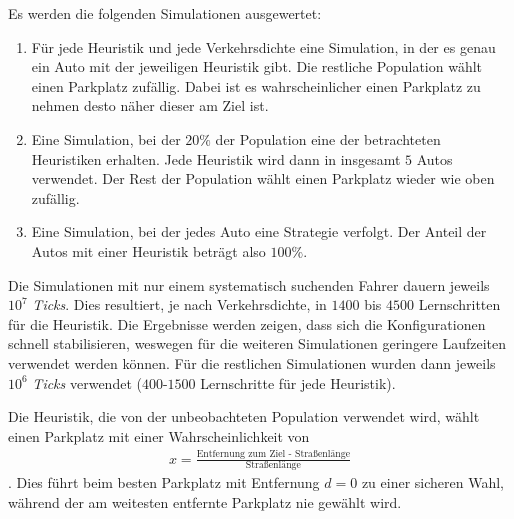 Es werden die folgenden Simulationen ausgewertet:
\begin{enumerate}
	\item Für jede Heuristik und jede Verkehrsdichte eine Simulation, in der es genau ein Auto mit der jeweiligen Heuristik gibt. Die restliche Population wählt einen Parkplatz zufällig. Dabei ist es wahrscheinlicher einen Parkplatz zu nehmen desto näher dieser am Ziel ist.
	\item Eine Simulation, bei der $20\%$ der Population eine der betrachteten Heuristiken erhalten. Jede Heuristik wird dann in insgesamt $5$ Autos verwendet. Der Rest der Population wählt einen Parkplatz wieder wie oben zufällig. 
	\item Eine Simulation, bei der jedes Auto eine Strategie verfolgt. Der Anteil der Autos mit einer Heuristik beträgt also $100\%$.
\end{enumerate}
Die Simulationen mit nur einem systematisch suchenden Fahrer dauern jeweils $10^7$ \emph{Ticks}. Dies resultiert, je nach Verkehrsdichte, in $1400$ bis $4500$ Lernschritten für die Heuristik. Die Ergebnisse werden zeigen, dass sich die Konfigurationen schnell stabilisieren, weswegen für die weiteren Simulationen geringere Laufzeiten verwendet werden können. Für die restlichen Simulationen wurden dann jeweils $10^6$ \emph{Ticks} verwendet ($400$-$1500$ Lernschritte für jede Heuristik).

Die Heuristik, die von der unbeobachteten Population verwendet wird, wählt einen Parkplatz mit einer Wahrscheinlichkeit von 
\begin{align}
x = \frac{\text{Entfernung zum Ziel - Straßenlänge} }{\text{Straßenlänge}}
\end{align}. 
Dies führt beim besten Parkplatz mit Entfernung $d=0$ zu einer sicheren Wahl, während der am weitesten entfernte Parkplatz nie gewählt wird.